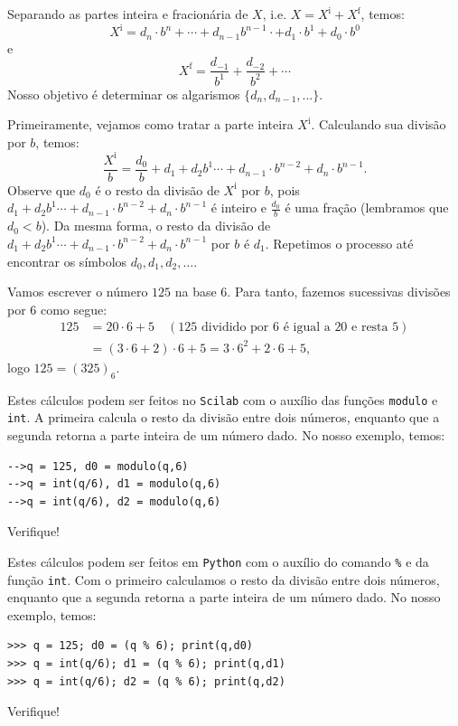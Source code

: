 Separando as partes inteira e fracionária de $X$, i.e. $X = X^{\mbox{i}} + X^{\mbox{f}}$, temos:
\begin{equation*}
X^{\mbox{i}} = d_n\cdot b^{n}+ \cdots+d_{n-1}b^{n-1} \cdot  +d_1\cdot b^1 +d_0\cdot b^0
\end{equation*}
e
\begin{equation*}
  X^{\mbox{f}} = \frac{d_{-1}}{b^1} + \frac{d_{-2}}{b^{2}} + \cdots
\end{equation*}
Nosso objetivo é determinar os algarismos $\{d_n, d_{n-1}, ...\}$. 

Primeiramente, vejamos como tratar a parte inteira $X^{\mbox{i}}$. Calculando sua divisão por $b$, temos:
\begin{equation*}
  \frac{X^{\mbox{i}}}{b}=   \frac{d_0}{b}+d_1+d_2 b^1\cdots+d_{n-1}\cdot b^{n-2} +d_n\cdot b^{n-1}.  
\end{equation*}
Observe que $d_0$ é o resto da divisão de $X^{\mbox{i}}$ por $b$, pois $d_1+d_2 b^1\cdots+d_{n-1}\cdot b^{n-2} +d_n\cdot b^{n-1}$ é inteiro e $\frac{d_0}{b}$ é uma fração (lembramos que $d_0<b$). Da mesma forma, o resto da divisão de $d_1+d_2 b^1\cdots+d_{n-1}\cdot b^{n-2} +d_n\cdot b^{n-1}$ por $b$ é $d_1$. Repetimos o processo até encontrar os símbolos $d_0, d_1, d_2, \ldots$.

\begin{ex} Vamos escrever o número $125$ na base $6$. Para tanto, fazemos sucessivas divisões por $6$ como segue:
  \begin{equation*}
    \begin{split}
      125 &= 20\cdot 6 + 5\quad(\mbox{$125$ dividido por $6$ é igual a $20$ e resta $5$})\\
      &= (3\cdot 6 + 2)\cdot 6 + 5 = 3\cdot 6^2 + 2\cdot 6 + 5,      
    \end{split}
  \end{equation*}
logo $125 = (325)_6$.

\ifisscilab
Estes cálculos podem ser feitos no \verb+Scilab+ com o auxílio das funções \verb'modulo' e \verb'int'. A primeira calcula o resto da divisão entre dois números, enquanto que a segunda retorna a parte inteira de um número dado. No nosso exemplo, temos:
\begin{verbatim}
-->q = 125, d0 = modulo(q,6)
-->q = int(q/6), d1 = modulo(q,6)
-->q = int(q/6), d2 = modulo(q,6)
\end{verbatim}
Verifique!
\fi

\ifispython
Estes cálculos podem ser feitos em \verb+Python+ com o auxílio do comando \verb+%+ e da função \verb'int'. Com o primeiro calculamos o resto da divisão entre dois números, enquanto que a segunda retorna a parte inteira de um número dado. No nosso exemplo, temos:
\begin{verbatim}
>>> q = 125; d0 = (q % 6); print(q,d0)
>>> q = int(q/6); d1 = (q % 6); print(q,d1)
>>> q = int(q/6); d2 = (q % 6); print(q,d2)
\end{verbatim}
Verifique!
\fi
\end{ex}

